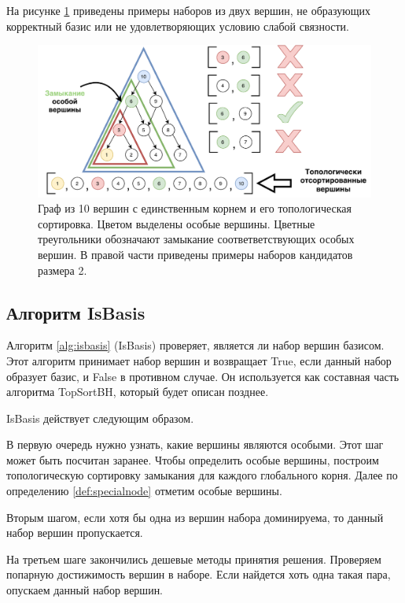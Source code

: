 \documentclass[12pt,a4paper,oneside,openany]{article}
\theoremstyle{definition}
\theoremstyle{lemma}
\theoremstyle{remark}
\begin{document}
На рисунке \ref{fig:candidatesfiltering} приведены примеры наборов из двух вершин, не образующих корректный базис
или не удовлетворяющих условию слабой связности.

\begin{figure}[H]
      \centering
      \includegraphics[width=1.0\linewidth]{images/candidates_filtering.pdf}
      \caption{Граф из 10 вершин с единственным корнем и его топологическая сортировка. Цветом выделены особые вершины.
Цветные треугольники обозначают замыкание соответветствующих особых вершин. В правой части приведены примеры наборов кандидатов размера 2.}
      \label{fig:candidatesfiltering}
\end{figure}

\subsection{Алгоритм IsBasis}\label{subsec:isbasis}

Алгоритм \ref{alg:isbasis} (IsBasis)  проверяет, является ли набор вершин базисом.
Этот алгоритм принимает набор вершин и возвращает True, если данный набор образует базис, и False в противном случае.
Он используется как составная часть алгоритма TopSortBH, который будет описан позднее.

IsBasis действует следующим образом.

В первую очередь нужно узнать, какие вершины являются особыми.
Этот шаг может быть посчитан заранее. Чтобы определить особые вершины,
построим топологическую сортировку замыкания для каждого глобального корня.
Далее по определению \ref{def:specialnode} отметим особые вершины.

Вторым шагом, если хотя бы одна из вершин набора доминируема, то данный набор вершин пропускается.

На третьем шаге закончились дешевые методы принятия решения.
Проверяем попарную достижимость вершин в наборе.
Если найдется хоть одна такая пара, опускаем данный набор вершин.
\end{document}
